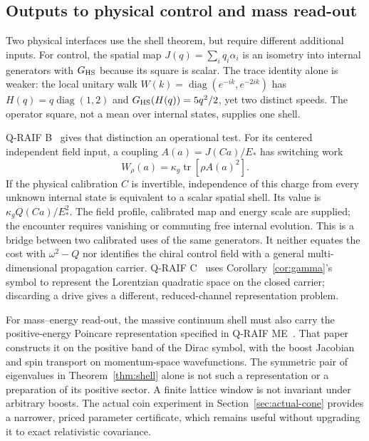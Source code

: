 \documentclass[12pt]{article}
\theoremstyle{definition}
\theoremstyle{remark}
\begin{document}
\subsection{Outputs to physical control and mass read-out}
\label{sec:physical-interfaces}

Two physical interfaces use the shell theorem, but require different
additional inputs. For control, the spatial map
$J(q)=\sum_iq_i\alpha_i$ is an isometry into internal generators with
$G_{\rm HS}$ because its square is scalar. The trace identity alone
is weaker: the local unitary walk
$W(k)=\operatorname{diag}(e^{-ik},e^{-2ik})$ has
$H(q)=q\operatorname{diag}(1,2)$ and
$G_{\rm HS}(H(q))=5q^2/2$, yet two distinct speeds.
The operator square, not a mean over internal states, supplies one shell.

Q-RAIF B~\cite{Liu2026QRAIF_B} gives that distinction an operational
test. For its centered independent field input, a coupling
$A(a)=J(Ca)/E_*$ has switching work
\[
 W_\rho(a)=\kappa_g\operatorname{tr}[\rho A(a)^2].
\]
If the physical calibration $C$ is invertible, independence of this
charge from every unknown internal state is equivalent to a scalar
spatial shell. Its value is
$\kappa_g Q(Ca)/E_*^2$.
The field profile, calibrated map and energy scale are supplied;
the encounter requires vanishing or commuting free internal
evolution. This is a bridge between two calibrated uses of the same
generators. It neither equates the cost with $\omega^2-Q$ nor
identifies the chiral control field with a general multi-dimensional
propagation carrier. Q-RAIF C~\cite{Liu2026QRAIF_C} uses
Corollary~\ref{cor:gamma}'s symbol to represent the Lorentzian
quadratic space on the closed carrier; discarding a drive gives a
different, reduced-channel representation problem.

For mass--energy read-out, the massive continuum shell must also
carry the positive-energy Poincare representation specified in
Q-RAIF ME~\cite{Liu2026QRAIF_ME}. That paper constructs it on the
positive band of the Dirac symbol, with the boost Jacobian and spin
transport on momentum-space wavefunctions. The symmetric pair of eigenvalues in
Theorem~\ref{thm:shell} alone is not such a representation or a
preparation of its positive sector. A finite lattice window is not
invariant under arbitrary boosts. The actual coin experiment in
Section~\ref{sec:actual-cone} provides a narrower, priced parameter
certificate, which remains useful without upgrading it to exact
relativistic covariance.

\end{document}
